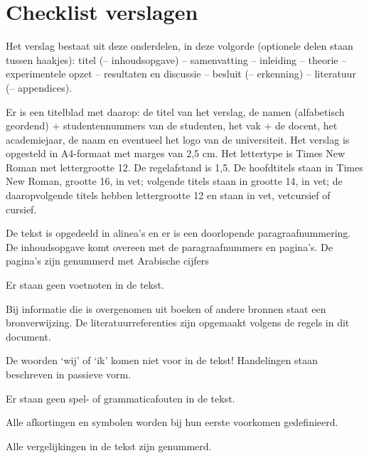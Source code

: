 \section{Checklist verslagen}

\begin{checklist}
    \checkeditem
        Het verslag bestaat uit deze onderdelen, in deze volgorde (optionele delen staan tussen haakjes): titel (– inhoudsopgave) – samenvatting – inleiding – theorie – experimentele opzet – resultaten en discussie – besluit (– erkenning) – literatuur (– appendices).
    \item
        Er is een titelblad met daarop: de titel van het verslag, de namen (alfabetisch geordend) + studentennummers van de studenten, het vak + de docent, het academiejaar, de naam en eventueel het logo van de universiteit.
    \checkeditem
        Het verslag is opgesteld in A4-formaat met marges van 2,5 cm. Het lettertype is Times New Roman met lettergrootte 12. De regelafstand is 1,5.
    \checkeditem
        De hoofdtitels staan in Times New Roman, grootte 16, in vet; volgende titels staan in grootte 14, in vet; de daaropvolgende titels hebben lettergrootte 12 en staan in vet, vetcursief of cursief.
    \item
        De tekst is opgedeeld in alinea’s en er is een doorlopende paragraafnummering.
    \checkeditem
        De inhoudsopgave komt overeen met de paragraafnummers en pagina’s.
    \checkeditem
        De pagina’s zijn genummerd met Arabische cijfers
    \item
        Er staan geen voetnoten in de tekst.
    \item
        Bij informatie die is overgenomen uit boeken of andere bronnen staat een bronverwijzing. De literatuurreferenties zijn opgemaakt volgens de regels in dit document.
    \item
        De woorden ‘wij’ of ‘ik’ komen niet voor in de tekst! Handelingen staan beschreven in passieve vorm.
    \item
        Er staan geen spel- of grammaticafouten in de tekst.
    \item
        Alle afkortingen en symbolen worden bij hun eerste voorkomen gedefinieerd.
    \item
        Alle vergelijkingen in de tekst zijn genummerd.
    \item

\end{checklist}
